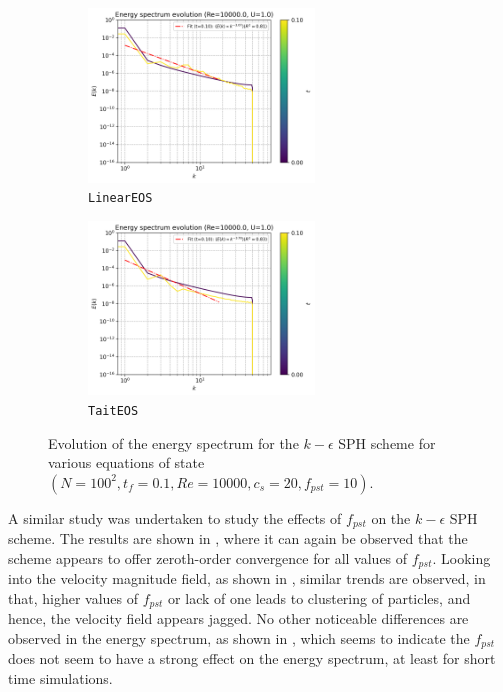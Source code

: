 \begin{figure}[H]
  \begin{subfigure}{7cm}
    \centering\includegraphics[width=6cm]{Code-Figures/keps/eos/c0_20_linear_pec_dtmul_1_nx_100_pst_10_re_10000_k_eps/energy_spectrum_evolution.png}
    \caption{\texttt{LinearEOS}}
  \end{subfigure}
  \begin{subfigure}{7cm}
    \centering\includegraphics[width=6cm]{Code-Figures/keps/eos/c0_20_tait_pec_dtmul_1_nx_100_pst_10_re_10000_k_eps/energy_spectrum_evolution.png}
    \caption{\texttt{TaitEOS}}
  \end{subfigure}
  \caption{Evolution of the energy spectrum for the $k-\epsilon$ SPH scheme for various equations of state $(N=100^2, t_f=0.1, Re=10000, c_s=20, f_{pst}=10)$.}
  \label{fig:keps-eos-espec}
\end{figure}

A similar study was undertaken to study the effects of $f_{pst}$ on the $k-\epsilon$ SPH scheme. The results are shown in , where it can again be observed that the scheme appears to offer zeroth-order convergence for all values of $f_{pst}$.
Looking into the velocity magnitude field, as shown in , similar trends are observed, in that, higher values of $f_{pst}$ or lack of one leads to clustering of particles, and hence, the velocity field appears jagged.
No other noticeable differences are observed in the energy spectrum, as shown in , which seems to indicate the $f_{pst}$ does not seem to have a strong effect on the energy spectrum, at least for short time simulations.

